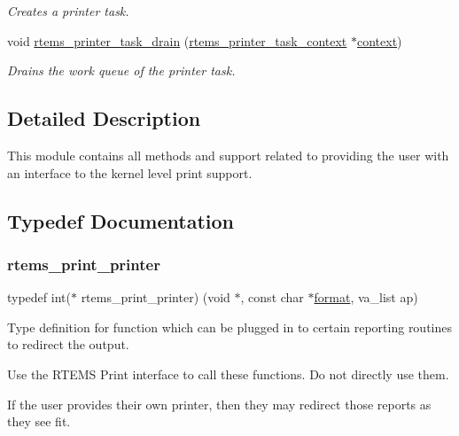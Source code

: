 \begin{DoxyCompactItemize}
\begin{DoxyCompactList}\small\item\em Creates a printer task. \end{DoxyCompactList}\item 
void \mbox{\hyperlink{group__RTEMSPrintSupport_ga96fffda2c9f3f85e47b6c15a2c6b3708}{rtems\+\_\+printer\+\_\+task\+\_\+drain}} (\mbox{\hyperlink{structrtems__printer__task__context}{rtems\+\_\+printer\+\_\+task\+\_\+context}} $\ast$\mbox{\hyperlink{sun4u_2tte_8h_a9b4a99475e2709333b8e5d70483173f1}{context}})
\begin{DoxyCompactList}\small\item\em Drains the work queue of the printer task. \end{DoxyCompactList}\end{DoxyCompactItemize}


\subsection{Detailed Description}
This module contains all methods and support related to providing the user with an interface to the kernel level print support. 

\subsection{Typedef Documentation}
\mbox{\label{group__RTEMSPrintSupport_ga1a1d078f9f2a229f68b017e3c21ded61}} 
\subsubsection{\texorpdfstring{rtems\_print\_printer}{rtems\_print\_printer}}
{\footnotesize\ttfamily typedef int($\ast$ rtems\+\_\+print\+\_\+printer) (void $\ast$, const char $\ast$\mbox{\hyperlink{structformat}{format}}, va\+\_\+list ap)}

Type definition for function which can be plugged in to certain reporting routines to redirect the output.

Use the R\+T\+E\+MS Print interface to call these functions. Do not directly use them.

If the user provides their own printer, then they may redirect those reports as they see fit. 

